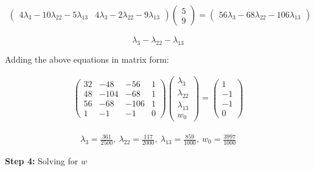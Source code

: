 \documentclass[12pt]{report}
\begin{document}
\begin{equation}
	\begin{aligned}             \begin{pmatrix}4\lambda_{3}-10\lambda_{22}-5\lambda_{13}&4\lambda_{3}-2\lambda_{22}-9\lambda_{13}\end{pmatrix}\begin{pmatrix}5\\ 9\end{pmatrix}=\begin{pmatrix}56\lambda_{3}-68\lambda_{22}-106\lambda_{13}\end{pmatrix}
	\end{aligned}
\end{equation}

\begin{equation}
	\lambda_{3}-\lambda_{22}-\lambda_{13}
\end{equation}

Adding the above equations in matrix form:

\begin{equation*}
	\begin{aligned}
		\begin{pmatrix}32 & -48 & -56 & 1 \\ 48&-104&-68&1\\ 56&-68&-106&1\\ 1&-1&-1&0\end{pmatrix}\begin{pmatrix}\lambda_{3}\\ \lambda_{22}\\ \lambda_{13}\\ w_{0}\end{pmatrix}=\begin{pmatrix}1\\ -1\\ -1\\ 0\end{pmatrix}
	\end{aligned}
\end{equation*}

\begin{equation*}
	\begin{aligned}
		\lambda_{3}=\frac{361}{2500},\:\lambda_{22}=\frac{117}{2000},\:\lambda_{13}=\frac{859}{1000},\:w_{0}=\frac{3997}{1000}
	\end{aligned}
\end{equation*}

\vspace{20pt}
\textbf{Step 4:} Solving for $w$
\end{document}
